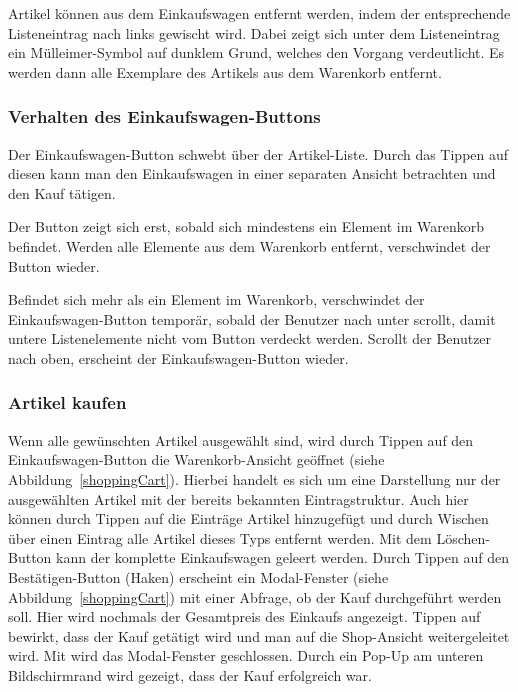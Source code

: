 Artikel können aus dem Einkaufswagen entfernt werden, indem der entsprechende Listeneintrag nach links gewischt wird.
Dabei zeigt sich unter dem Listeneintrag ein Mülleimer-Symbol auf dunklem Grund, welches den Vorgang verdeutlicht.
Es werden dann alle Exemplare des Artikels aus dem Warenkorb entfernt.

\subsubsection{Verhalten des Einkaufswagen-Buttons} \label{subsubsec:shoppingcart-button}

Der Einkaufswagen-Button schwebt über der Artikel-Liste.
Durch das Tippen auf diesen kann man den Einkaufswagen in einer separaten Ansicht betrachten und den Kauf tätigen.

Der Button zeigt sich erst, sobald sich mindestens ein Element im Warenkorb befindet.
Werden alle Elemente aus dem Warenkorb entfernt, verschwindet der Button wieder.

Befindet sich mehr als ein Element im Warenkorb, verschwindet der Einkaufswagen-Button temporär, sobald der Benutzer nach unter scrollt, damit untere Listenelemente nicht vom Button verdeckt werden.
Scrollt der Benutzer nach oben, erscheint der Einkaufswagen-Button wieder.

\subsubsection{Artikel kaufen} \label{subsubsec:shop-buy}

Wenn alle gewünschten Artikel ausgewählt sind, wird durch Tippen auf den Einkaufswagen-Button die Warenkorb-Ansicht geöffnet (siehe Abbildung~\ref{shoppingCart}).
Hierbei handelt es sich um eine Darstellung nur der ausgewählten Artikel mit der bereits bekannten Eintragstruktur.
Auch hier können durch Tippen auf die Einträge Artikel hinzugefügt und durch Wischen über einen Eintrag alle Artikel dieses Typs entfernt werden.
Mit dem Löschen-Button kann der komplette Einkaufswagen geleert werden.
Durch Tippen auf den Bestätigen-Button (Haken) erscheint ein Modal-Fenster (siehe Abbildung~\ref{shoppingCart}) mit einer Abfrage, ob der Kauf durchgeführt werden soll.
Hier wird nochmals der Gesamtpreis des Einkaufs angezeigt.
Tippen auf  bewirkt, dass der Kauf getätigt wird und man auf die Shop-Ansicht weitergeleitet wird.
Mit  wird das Modal-Fenster geschlossen.
Durch ein Pop-Up am unteren Bildschirmrand wird gezeigt, dass der Kauf erfolgreich war.


